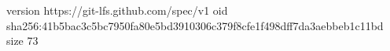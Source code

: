 version https://git-lfs.github.com/spec/v1
oid sha256:41b5bac3c5bc7950fa80e5bd3910306c379f8cfe1f498dff7da3aebbeb1c11bd
size 73
